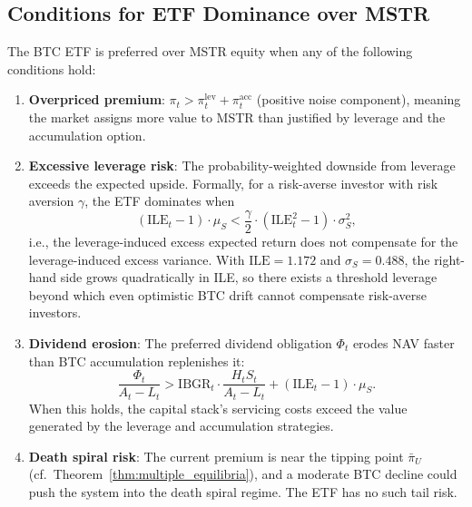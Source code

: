 \subsection{Conditions for ETF Dominance over MSTR}
\label{subsec:etf_dominates}

\begin{theorem}
\label{thm:etf_dominates}
The BTC ETF is preferred over MSTR equity when any of the following conditions hold:
\begin{enumerate}
  \item \textbf{Overpriced premium}: $\pi_t > \pi_t^{\mathrm{lev}} + \pi_t^{\mathrm{acc}}$ (positive noise component), meaning the market assigns more value to MSTR than justified by leverage and the accumulation option.

  \item \textbf{Excessive leverage risk}: The probability-weighted downside from leverage exceeds the expected upside. Formally, for a risk-averse investor with risk aversion $\gamma$, the ETF dominates when
  \begin{equation}
  \label{eq:leverage_risk}
    (\mathrm{ILE}_t - 1) \cdot \mu_S < \frac{\gamma}{2} \cdot (\mathrm{ILE}_t^2 - 1) \cdot \sigma_S^2,
  \end{equation}
  i.e., the leverage-induced excess expected return does not compensate for the leverage-induced excess variance. With $\mathrm{ILE} = 1.172$ and $\sigma_S = 0.488$, the right-hand side grows quadratically in ILE, so there exists a threshold leverage beyond which even optimistic BTC drift cannot compensate risk-averse investors.

  \item \textbf{Dividend erosion}: The preferred dividend obligation $\Phi_t$ erodes NAV faster than BTC accumulation replenishes it:
  \begin{equation}
  \label{eq:dividend_erosion}
    \frac{\Phi_t}{A_t - L_t} > \mathrm{IBGR}_t \cdot \frac{H_t S_t}{A_t - L_t} + (\mathrm{ILE}_t - 1) \cdot \mu_S.
  \end{equation}
  When this holds, the capital stack's servicing costs exceed the value generated by the leverage and accumulation strategies.

  \item \textbf{Death spiral risk}: The current premium is near the tipping point $\bar{\pi}_U$ (cf.\ Theorem~\ref{thm:multiple_equilibria}), and a moderate BTC decline could push the system into the death spiral regime. The ETF has no such tail risk.
\end{enumerate}
\end{theorem}

